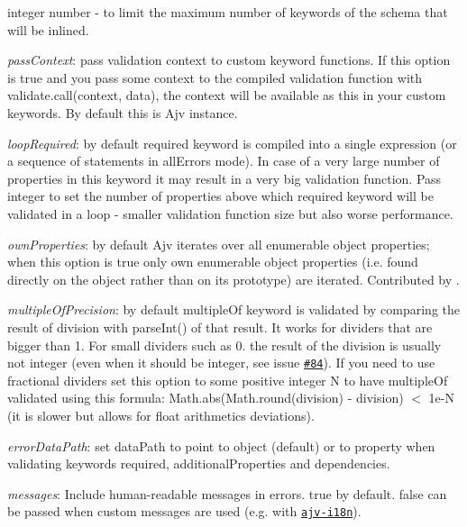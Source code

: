 \begin{DoxyItemize}
\begin{DoxyItemize}
\item integer number -\/ to limit the maximum number of keywords of the schema that will be inlined.
\end{DoxyItemize}
\item {\itshape pass\+Context}\+: pass validation context to custom keyword functions. If this option is {\ttfamily true} and you pass some context to the compiled validation function with {\ttfamily validate.\+call(context, data)}, the {\ttfamily context} will be available as {\ttfamily this} in your custom keywords. By default {\ttfamily this} is Ajv instance.
\item {\itshape loop\+Required}\+: by default {\ttfamily required} keyword is compiled into a single expression (or a sequence of statements in {\ttfamily all\+Errors} mode). In case of a very large number of properties in this keyword it may result in a very big validation function. Pass integer to set the number of properties above which {\ttfamily required} keyword will be validated in a loop -\/ smaller validation function size but also worse performance.
\item {\itshape own\+Properties}\+: by default Ajv iterates over all enumerable object properties; when this option is {\ttfamily true} only own enumerable object properties (i.\+e. found directly on the object rather than on its prototype) are iterated. Contributed by .
\item {\itshape multiple\+Of\+Precision}\+: by default {\ttfamily multiple\+Of} keyword is validated by comparing the result of division with parse\+Int() of that result. It works for dividers that are bigger than 1. For small dividers such as 0. the result of the division is usually not integer (even when it should be integer, see issue \href{https://github.com/epoberezkin/ajv/issues/84}{\tt \#84}). If you need to use fractional dividers set this option to some positive integer N to have {\ttfamily multiple\+Of} validated using this formula\+: {\ttfamily Math.\+abs(Math.\+round(division) -\/ division) $<$ 1e-\/N} (it is slower but allows for float arithmetics deviations).
\item {\itshape error\+Data\+Path}\+: set {\ttfamily data\+Path} to point to \textquotesingle{}object\textquotesingle{} (default) or to \textquotesingle{}property\textquotesingle{} when validating keywords {\ttfamily required}, {\ttfamily additional\+Properties} and {\ttfamily dependencies}.
\item {\itshape messages}\+: Include human-\/readable messages in errors. {\ttfamily true} by default. {\ttfamily false} can be passed when custom messages are used (e.\+g. with \href{https://github.com/epoberezkin/ajv-i18n}{\tt ajv-\/i18n}).

\end{DoxyItemize}
